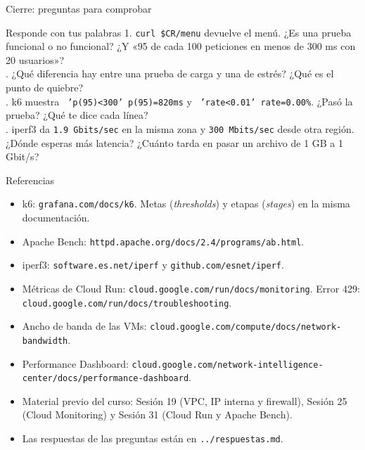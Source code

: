 \documentclass[aspectratio=169,10pt,c]{beamer}
\begin{document}
\begin{frame}{Cierre: preguntas para comprobar}
\begin{block}{Responde con tus palabras}
\small
1. \texttt{curl \$CR/menu} devuelve el menú. ¿Es una prueba funcional o no funcional? ¿Y «95 de cada 100 peticiones en menos de 300 ms con 20 usuarios»?\\. ¿Qué diferencia hay entre una prueba de carga y una de estrés? ¿Qué es el punto de quiebre?\\. k6 muestra \texttt{ 'p(95)<300' p(95)=820ms} y \texttt{ 'rate<0.01' rate=0.00\%}. ¿Pasó la prueba? ¿Qué te dice cada línea?\\. iperf3 da \texttt{1.9 Gbits/sec} en la misma zona y \texttt{300 Mbits/sec} desde otra región. ¿Dónde esperas más latencia? ¿Cuánto tarda en pasar un archivo de 1 GB a 1 Gbit/s?
\end{block}
\end{frame}

\begin{frame}{Referencias}
\scriptsize
\begin{itemize}\setlength\itemsep{4pt}
  \item k6: \texttt{grafana.com/docs/k6}. Metas (\textit{thresholds}) y etapas (\textit{stages}) en la misma documentación.
  \item Apache Bench: \texttt{httpd.apache.org/docs/2.4/programs/ab.html}.
  \item iperf3: \texttt{software.es.net/iperf} y \texttt{github.com/esnet/iperf}.
  \item Métricas de Cloud Run: \texttt{cloud.google.com/run/docs/monitoring}. Error 429: \texttt{cloud.google.com/run/docs/troubleshooting}.
  \item Ancho de banda de las VMs: \texttt{cloud.google.com/compute/docs/network-bandwidth}.
  \item Performance Dashboard: \texttt{cloud.google.com/network-intelligence-center/docs/performance-dashboard}.
  \item Material previo del curso: Sesión 19 (VPC, IP interna y firewall), Sesión 25 (Cloud Monitoring) y Sesión 31 (Cloud Run y Apache Bench).
  \item Las respuestas de las preguntas están en \texttt{../respuestas.md}.
\end{itemize}
\end{frame}
\end{document}
